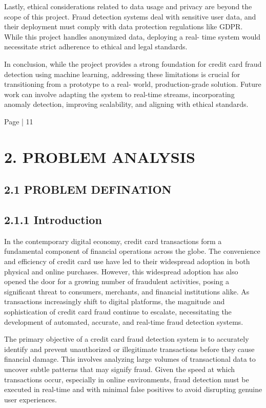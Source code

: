 \documentclass[11pt,a4paper]{article}
\begin{document}
Lastly, ethical considerations related to data usage and privacy are beyond the scope of this project. 
Fraud detection systems deal with sensitive user data, and their deployment must comply with data 
protection regulations like GDPR. While this project handles anonymized data, deploying a real-
time system would necessitate strict adherence to ethical and legal standards. 

In conclusion, while the project provides a strong foundation for credit card fraud detection using 
machine learning, addressing these limitations is crucial for transitioning from a prototype to a real-
world, production-grade solution. Future work can involve adapting the system to real-time streams, 
incorporating anomaly detection, improving scalability, and aligning with ethical standards. 

Page | 11  

\newpage

\section*{2. PROBLEM ANALYSIS }

\subsection*{    2.1 PROBLEM DEFINATION  }

\subsection*{2.1.1 Introduction }

In the contemporary digital economy, credit card transactions form a fundamental component of financial 
operations across the globe. The convenience and efficiency of credit card use have led to their widespread 
adoption in both physical and online purchases. However, this widespread adoption has also opened the door 
for a growing number of fraudulent activities, posing a significant threat to consumers, merchants, and 
financial institutions alike. As transactions increasingly shift to digital platforms, the magnitude and 
sophistication of credit card fraud continue to escalate, necessitating the development of automated, accurate, 
and real-time fraud detection systems. 

The primary objective of a credit card fraud detection system is to accurately identify and prevent 
unauthorized or illegitimate transactions before they cause financial damage. This involves analyzing large 
volumes of transactional data to uncover subtle patterns that may signify fraud. Given the speed at which 
transactions occur, especially in online environments, fraud detection must be executed in real-time and with 
minimal false positives to avoid disrupting genuine user experiences. 
\end{document}
